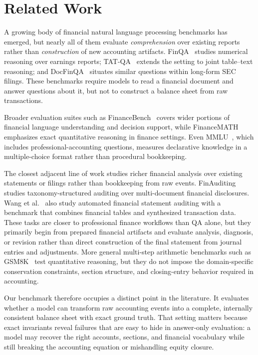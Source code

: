 \section{Related Work}

A growing body of financial natural language processing benchmarks has
emerged, but nearly all of them evaluate \emph{comprehension} over
existing reports rather than \emph{construction} of new accounting
artifacts.
FinQA~\citep{chen2021finqa} studies numerical reasoning over
earnings reports;
TAT-QA~\citep{zhu2021tatqa} extends the setting to joint table--text
reasoning; and
DocFinQA~\citep{reddy2024docfinqa} situates similar questions within
long-form SEC filings.
These benchmarks require models to read a financial document and answer
questions about it, but not to construct a balance sheet from raw
transactions.

Broader evaluation suites such as
FinanceBench~\citep{islam2023financebench} covers wider portions of
financial language understanding and decision support, while
FinanceMATH~\citep{zhao2024financemath} emphasizes exact quantitative
reasoning in finance settings.
Even MMLU~\citep{hendrycks2021mmlu}, which includes
professional-accounting questions, measures declarative knowledge in a
multiple-choice format rather than procedural bookkeeping.

The closest adjacent line of work studies richer financial analysis
over existing statements or filings rather than bookkeeping from raw
events.
FinAuditing
~\citep{wang2025finauditing} studies taxonomy-structured auditing over
multi-document financial disclosures.
Wang et al.~\citep{wang2025automating} also study automated financial
statement auditing with a benchmark that combines financial tables and
synthesized transaction data.
These tasks are closer to professional finance workflows than QA alone,
but they primarily begin from prepared financial artifacts and evaluate
analysis, diagnosis, or revision rather than direct construction of the
final statement from journal entries and adjustments.
More general multi-step arithmetic benchmarks such as
GSM8K~\citep{cobbe2021gsm8k} test quantitative reasoning, but they do
not impose the domain-specific conservation constraints, section
structure, and closing-entry behavior required in accounting.



Our benchmark therefore occupies a distinct point in the literature.
It evaluates whether a model can transform raw accounting events into a
complete, internally consistent balance sheet with exact ground truth.
That setting matters because exact invariants reveal failures that are
easy to hide in answer-only evaluation: a model may recover the right
accounts, sections, and financial vocabulary while still breaking the
accounting equation or mishandling equity closure.
